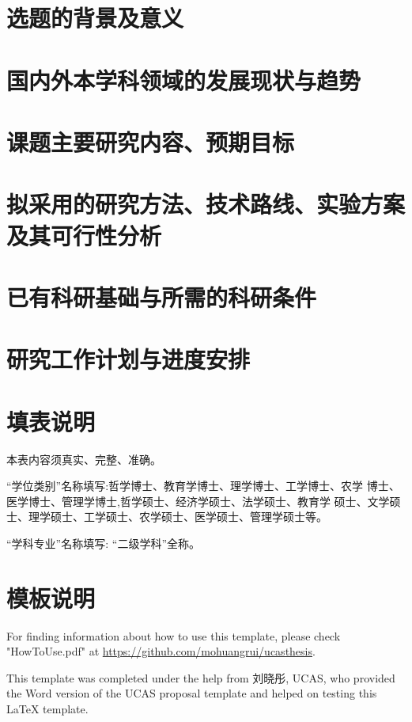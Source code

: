 \section{选题的背景及意义}

\section{国内外本学科领域的发展现状与趋势}

\section{课题主要研究内容、预期目标}

\section{拟采用的研究方法、技术路线、实验方案及其可行性分析}

\section{已有科研基础与所需的科研条件}

\section{研究工作计划与进度安排}

\section*{填表说明}

本表内容须真实、完整、准确。

“学位类别”名称填写:哲学博士、教育学博士、理学博士、工学博士、农学 博士、医学博士、管理学博士,哲学硕士、经济学硕士、法学硕士、教育学 硕士、文学硕士、理学硕士、工学硕士、农学硕士、医学硕士、管理学硕士等。

“学科专业”名称填写: “二级学科”全称。

\section*{模板说明}

For finding information about how to use this template, please check "HowToUse.pdf" at \url{https://github.com/mohuangrui/ucasthesis}.

This template was completed under the help from 刘晓彤, UCAS, who provided the Word version of the UCAS proposal template and helped on testing this \LaTeX{} template.


